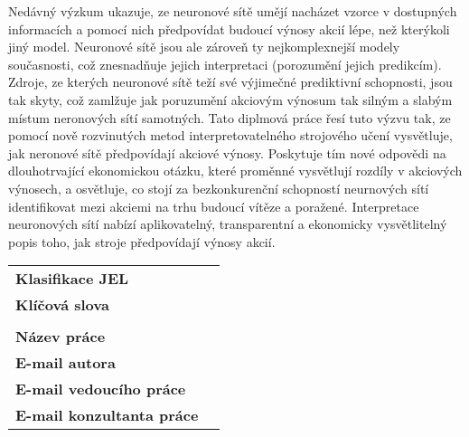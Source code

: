 Ned\'{a}vn\'{y} v\'{y}zkum ukazuje, ze neuronov\'{e} s\'{i}t\v{e} um\v{e}j\'{i} nach\'{a}zet vzorce v dostupn\'{y}ch informac\'{i}ch a pomoc\'{i} nich p\v{r}edpov\'{i}dat budouc\'{i} v\'{y}nosy akci\'{i} l\'{e}pe, ne\v{z} kter\'{y}koli jin\'{y} model. Neuronov\'{e} s\'{i}t\v{e} jsou ale z\'{a}rove\v{n} ty nejkomplexnej\v{s}\'{i} modely sou\v{c}asnosti, co\v{z} znesnad\v{n}uje jejich interpretaci (porozum\v{e}n\'{i} jejich predikc\'{i}m). Zdroje, ze kter\'{y}ch neuronov\'{e} s\'{i}t\v{e} te\v{z}\'{i} sv\'{e} v\'{y}jime\v{c}n\'{e} prediktivn\'{i} schopnosti, jsou tak skyty, co\v{z} zaml\v{z}uje jak poruzum\v{e}n\'{i} akciov\'{y}m v\'{y}nosum tak siln\'{y}m a slab\'{y}m m\'{i}stum neronov\'{y}ch s\'{i}t\'{i} samotn\'{y}ch. Tato diplmov\'{a} pr\'{a}ce \v{r}es\'{i} tuto v\'{y}zvu tak, ze pomoc\'{i} nov\v{e} rozvinut\'{y}ch metod interpretovateln\'{e}ho strojov\'{e}ho u\v{c}en\'{i} vysv\v{e}tluje, jak neronov\'{e} s\'{i}t\v{e} p\v{r}edpov\'{i}daj\'{i} akciov\'{e} v\'{y}nosy. Poskytuje t\'{i}m nov\'{e} odpov\v{e}di na dlouhotrvaj\'{i}c\'{i} ekonomickou ot\'{a}zku, kter\'{e} prom\v{e}nn\'{e} vysv\v{e}tluj\'{i} rozd\'{i}ly v akciov\'{y}ch v\'{y}nosech, a osv\v{e}tluje, co stoj\'{i} za bezkonkuren\v{c}n\'{i} schopnost\'{i} neurnov\'{y}ch s\'{i}t\'{i} identifikovat mezi akciemi na trhu budouc\'{i} v\'{i}t\v{e}ze a pora\v{z}en\'{e}. Interpretace neuronov\'{y}ch s\'{i}t\'{i} nab\'{i}z\'{i} aplikovateln\'{y}, transparentn\'{i} a ekonomicky vysv\v{e}tliteln\'{y} popis toho, jak stroje p\v{r}edpov\'{i}daj\'{i} v\'{y}nosy akci\'{i}.

 
\bigskip

\begin{tabular}{lp{7.7cm}}
		\textbf{Klasifikace JEL} & \JEL \\
		\textbf{Kl\'{i}\v{c}ov\'{a} slova} & \Klic \\
 		& \\
		\textbf{N\'{a}zev pr\'{a}ce} & \BooknameCZ \\
 		\textbf{E-mail autora} & \texttt{\href{mailto:\Email}{\Email}}\\
		\textbf{E-mail vedouc\'{i}ho pr\'{a}ce} & \texttt{\href{mailto:\EmailSup}{\EmailSup}}\\
		\textbf{E-mail konzultanta pr\'{a}ce} & \texttt{\href{mailto:\EmailCon}{\EmailCon}}\\
\end{tabular}


